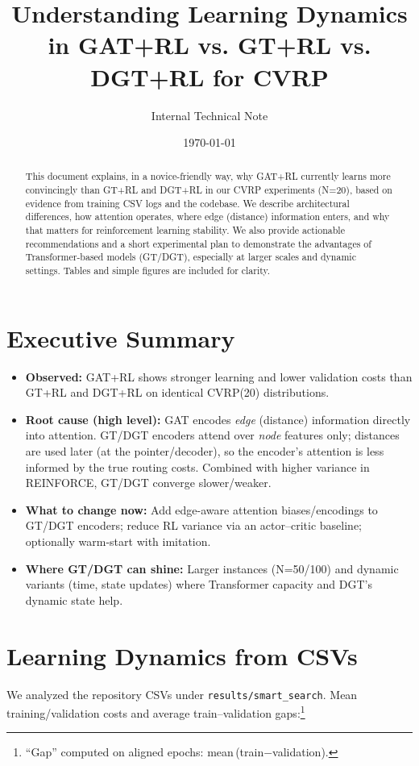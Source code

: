 \documentclass[11pt,a4paper]{article}
\title{Understanding Learning Dynamics in GAT+RL vs. GT+RL vs. DGT+RL for CVRP}
\author{Internal Technical Note}
\date{\today}
\begin{document}
\maketitle

\begin{abstract}
This document explains, in a novice-friendly way, why GAT+RL currently learns more convincingly than GT+RL and DGT+RL in our CVRP experiments (N=20), based on evidence from training CSV logs and the codebase. We describe architectural differences, how attention operates, where edge (distance) information enters, and why that matters for reinforcement learning stability. We also provide actionable recommendations and a short experimental plan to demonstrate the advantages of Transformer-based models (GT/DGT), especially at larger scales and dynamic settings. Tables and simple figures are included for clarity.
\end{abstract}

\section{Executive Summary}
\begin{itemize}[leftmargin=*]
  \item \textbf{Observed:} GAT+RL shows stronger learning and lower validation costs than GT+RL and DGT+RL on identical CVRP(20) distributions.
  \item \textbf{Root cause (high level):} GAT encodes \emph{edge} (distance) information directly into attention. GT/DGT encoders attend over \emph{node} features only; distances are used later (at the pointer/decoder), so the encoder's attention is less informed by the true routing costs. Combined with higher variance in REINFORCE, GT/DGT converge slower/weaker.
  \item \textbf{What to change now:} Add edge-aware attention biases/encodings to GT/DGT encoders; reduce RL variance via an actor--critic baseline; optionally warm-start with imitation.
  \item \textbf{Where GT/DGT can shine:} Larger instances (N=50/100) and dynamic variants (time, state updates) where Transformer capacity and DGT's dynamic state help.
\end{itemize}

\section{Learning Dynamics from CSVs}
We analyzed the repository CSVs under \texttt{results/smart\_search}. Mean training/validation costs and average train--validation gaps:\footnote{``Gap'' computed on aligned epochs: mean\,(train$-$validation).}
\end{document}
